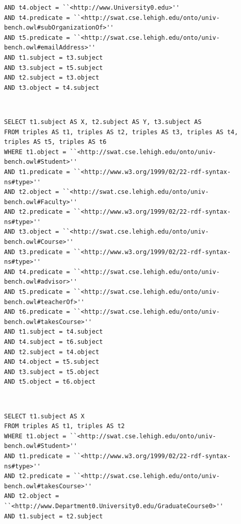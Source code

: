 \documentclass[10pt, a4paper]{report}
\begin{document}
\begin{enumerate}
\begin{minipage}{0.92\textwidth}
\begin{lstlisting}
AND t4.object = ``<http://www.University0.edu>''
AND t4.predicate = ``<http://swat.cse.lehigh.edu/onto/univ-bench.owl#subOrganizationOf>''
AND t5.predicate = ``<http://swat.cse.lehigh.edu/onto/univ-bench.owl#emailAddress>''
AND t1.subject = t3.subject
AND t3.subject = t5.subject
AND t2.subject = t3.object
AND t3.object = t4.subject
                        \end{lstlisting}
	\end{minipage} \\
	\begin{minipage}{0.92\textwidth}
		\item \label{query:lumb_sql_9}
		\lstset{language=sql}
		\begin{lstlisting}
SELECT t1.subject AS X, t2.subject AS Y, t3.subject AS 
FROM triples AS t1, triples AS t2, triples AS t3, triples AS t4, triples AS t5, triples AS t6
WHERE t1.object = ``<http://swat.cse.lehigh.edu/onto/univ-bench.owl#Student>''
AND t1.predicate = ``<http://www.w3.org/1999/02/22-rdf-syntax-ns#type>''
AND t2.object = ``<http://swat.cse.lehigh.edu/onto/univ-bench.owl#Faculty>''
AND t2.predicate = ``<http://www.w3.org/1999/02/22-rdf-syntax-ns#type>''
AND t3.object = ``<http://swat.cse.lehigh.edu/onto/univ-bench.owl#Course>''
AND t3.predicate = ``<http://www.w3.org/1999/02/22-rdf-syntax-ns#type>''
AND t4.predicate = ``<http://swat.cse.lehigh.edu/onto/univ-bench.owl#advisor>''
AND t5.predicate = ``<http://swat.cse.lehigh.edu/onto/univ-bench.owl#teacherOf>''
AND t6.predicate = ``<http://swat.cse.lehigh.edu/onto/univ-bench.owl#takesCourse>''
AND t1.subject = t4.subject
AND t4.subject = t6.subject
AND t2.subject = t4.object
AND t4.object = t5.subject
AND t3.subject = t5.object
AND t5.object = t6.object
                        \end{lstlisting}
	\end{minipage} \\
	\begin{minipage}{0.92\textwidth}
		\item \label{query:lumb_sql_10}
		\lstset{language=sql}
		\begin{lstlisting}
SELECT t1.subject AS X
FROM triples AS t1, triples AS t2
WHERE t1.object = ``<http://swat.cse.lehigh.edu/onto/univ-bench.owl#Student>''
AND t1.predicate = ``<http://www.w3.org/1999/02/22-rdf-syntax-ns#type>''
AND t2.predicate = ``<http://swat.cse.lehigh.edu/onto/univ-bench.owl#takesCourse>''
AND t2.object = ``<http://www.Department0.University0.edu/GraduateCourse0>''
AND t1.subject = t2.subject
                        \end{lstlisting}

\end{minipage}
\end{enumerate}
\end{document}
